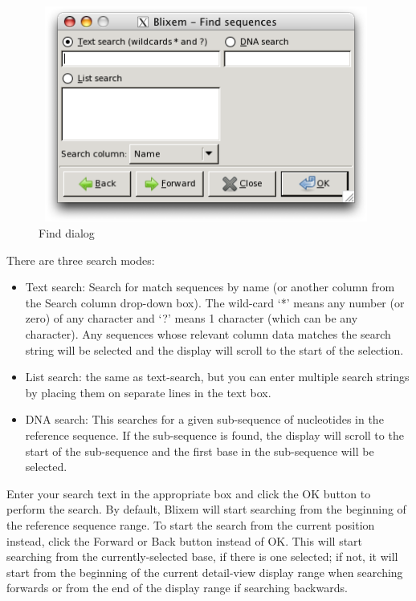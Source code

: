 \documentclass[letterpaper]{article}
\newcommand\liststyleWWviiiNumxxvii{%
\renewcommand\labelitemi{{\textbullet}}
\renewcommand\labelitemii{o}
\renewcommand\labelitemiii{[F0A7?]}
\renewcommand\labelitemiv{[F0B7?]}
}
\begin{document}
\begin{figure}
\centering
\color[rgb]{0.30980393,0.5058824,0.7411765}
\includegraphics[width=11.037cm,height=7.103cm]{img_dialog_find.png}
\caption{Find dialog}
\end{figure}

\bigskip

{There are three search modes:}

\liststyleWWviiiNumxxvii
\begin{itemize}
\item {
Text search: Search for match sequences by name (or another column from
the {\textquotesingle}Search column{\textquotesingle} drop-down box).
The wild-card {\textquoteleft}*{\textquoteright} means any number (or
zero) of any character and {\textquoteleft}?{\textquoteright} means 1
character (which can be any character). Any sequences whose relevant
column data matches the search string will be selected and the display
will scroll to the start of the selection. }
\item {
List search: the same as text-search, but you can enter multiple search
strings by placing them on separate lines in the text box.}
\item {
DNA search: This searches for a given sub-sequence of nucleotides in the
reference sequence. If the sub-sequence is found, the display will
scroll to the start of the sub-sequence and the first base in the
sub-sequence will be selected.}
\end{itemize}

{Enter your search text in the appropriate box and click the OK button to
perform the search. By default, Blixem will start searching from the
beginning of the reference sequence range. To start the search from
the current position instead, click the Forward or Back button instead
of OK. This will start searching from the currently-selected base, if
there is one selected; if not, it will start from the beginning of the
current detail-view display range when searching forwards or from the
end of the display range if searching backwards.}
\end{document}
